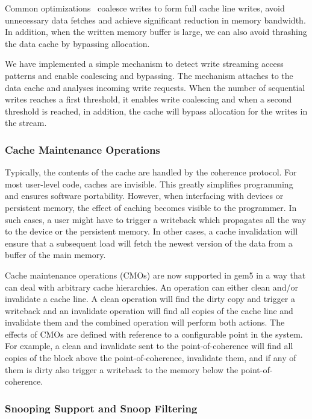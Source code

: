 Common optimizations~\cite{10.1145/173682.165154} coalesce writes to form full cache line writes, avoid unnecessary data fetches and achieve significant reduction in memory bandwidth.
In addition, when the written memory buffer is large, we can also avoid thrashing the data cache by bypassing allocation.

We have implemented a simple mechanism to detect write streaming access patterns and enable coalescing and bypassing.
The mechanism attaches to the data cache and analyses incoming write requests. When the number of sequential writes reaches a first threshold, it enables write coalescing and when a second threshold is reached, in addition, the cache will bypass allocation for the writes in the stream.

\subsubsection[Cache Maintenance Operations]{Cache Maintenance Operations}

Typically, the contents of the cache are handled by the coherence protocol.
For most user-level code, caches are invisible.
This greatly simplifies programming and ensures software portability.
However, when interfacing with devices or persistent memory, the effect of caching becomes visible to the programmer.
In such cases, a user might have to trigger a writeback which propagates all the way to the device or the persistent memory.
In other cases, a cache invalidation will ensure that a subsequent load will fetch the newest version of the data from a buffer of the main memory.

Cache maintenance operations (CMOs) are now supported in gem5 in a way that can deal with arbitrary cache hierarchies.
An operation can either clean and/or invalidate a cache line.
A clean
operation will find the dirty copy and trigger a writeback and an invalidate operation will find all copies of the cache line and invalidate them and the combined operation will perform both actions.
The effects of CMOs are defined with reference to a configurable point in the system.
For example, a clean and invalidate sent to the point-of-coherence will find all copies of the block above the point-of-coherence, invalidate them, and if any of them is dirty also trigger a writeback to the memory below the point-of-coherence.

\subsubsection[Snooping Support and Snoop Filtering]{Snooping Support and Snoop Filtering}

